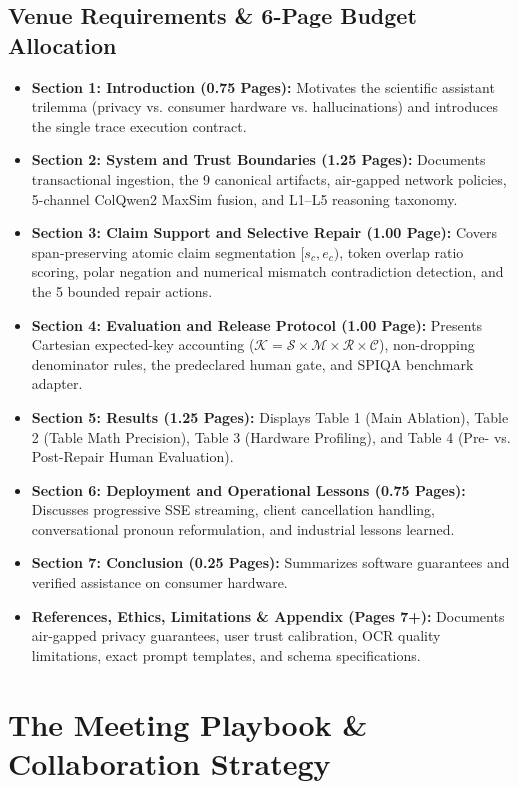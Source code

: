 \documentclass[11pt,a4paper]{article}
\begin{document}
\subsection{Venue Requirements \& 6-Page Budget Allocation}
\begin{itemize}[leftmargin=*]
    \item \textbf{Section 1: Introduction (0.75 Pages):} Motivates the scientific assistant trilemma (privacy vs. consumer hardware vs. hallucinations) and introduces the single trace execution contract.
    \item \textbf{Section 2: System and Trust Boundaries (1.25 Pages):} Documents transactional ingestion, the 9 canonical artifacts, air-gapped network policies, 5-channel ColQwen2 MaxSim fusion, and L1--L5 reasoning taxonomy.
    \item \textbf{Section 3: Claim Support and Selective Repair (1.00 Page):} Covers span-preserving atomic claim segmentation $[s_c, e_c)$, token overlap ratio scoring, polar negation and numerical mismatch contradiction detection, and the 5 bounded repair actions.
    \item \textbf{Section 4: Evaluation and Release Protocol (1.00 Page):} Presents Cartesian expected-key accounting ($\mathcal{K} = \mathcal{S} \times \mathcal{M} \times \mathcal{R} \times \mathcal{C}$), non-dropping denominator rules, the predeclared human gate, and SPIQA benchmark adapter.
    \item \textbf{Section 5: Results (1.25 Pages):} Displays Table 1 (Main Ablation), Table 2 (Table Math Precision), Table 3 (Hardware Profiling), and Table 4 (Pre- vs. Post-Repair Human Evaluation).
    \item \textbf{Section 6: Deployment and Operational Lessons (0.75 Pages):} Discusses progressive SSE streaming, client cancellation handling, conversational pronoun reformulation, and industrial lessons learned.
    \item \textbf{Section 7: Conclusion (0.25 Pages):} Summarizes software guarantees and verified assistance on consumer hardware.
    \item \textbf{References, Ethics, Limitations \& Appendix (Pages 7+):} Documents air-gapped privacy guarantees, user trust calibration, OCR quality limitations, exact prompt templates, and schema specifications.
\end{itemize}

\vspace{12pt}

\section{The Meeting Playbook \& Collaboration Strategy}
\end{document}
